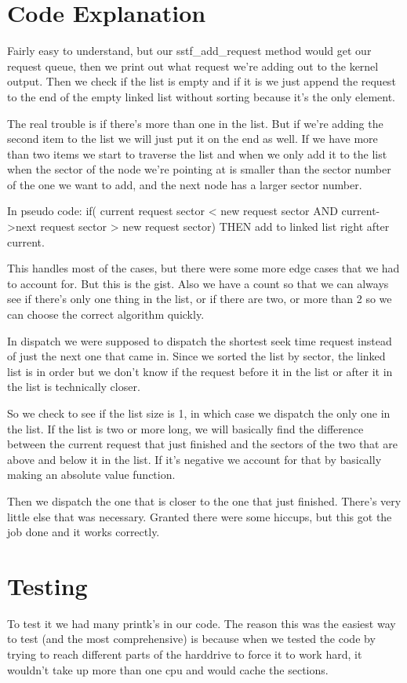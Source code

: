 \documentclass[letterpaper,10pt]{article}
\begin{document}
\section{Code Explanation}
Fairly easy to understand, but our sstf\_add\_request method would get our request queue, then we print out what request we're adding out to the kernel output. Then we check if the list is empty and if it is we just append the request to the end of the empty linked list without sorting because it's the only element. 

The real trouble is if there's more than one in the list. But if we're adding the second item to the list we will just put it on the end as well. If we have more than two items we start to traverse the list and when we only add it to the list when the sector of the node we're pointing at is smaller than the sector number of the one we want to add, and the next node has a larger sector number. 

In pseudo code: if( current request sector < new request sector AND current->next request sector > new request sector) THEN add to linked list right after current. 

This handles most of the cases, but there were some more edge cases that we had to account for. But this is the gist. Also we have a count so that we can always see if there's only one thing in the list, or if there are two, or more than 2 so we can choose the correct algorithm quickly.

In dispatch we were supposed to dispatch the shortest seek time request instead of just the next one that came in. Since we sorted the list by sector, the linked list is in order but we don't know if the request before it in the list or after it in the list is technically closer. 

So we check to see if the list size is 1, in which case we dispatch the only one in the list. If the list is two or more long, we will basically find the difference between the current request that just finished and the sectors of the two that are above and below it in the list. If it's negative we account for that by basically making an absolute value function. 

Then we dispatch the one that is closer to the one that just finished. There's very little else that was necessary. Granted there were some hiccups, but this got the job done and it works correctly. 

\section{Testing}
To test it we had many printk's in our code. The reason this was the easiest way to test (and the most comprehensive) is because when we tested the code by trying to reach different parts of the harddrive to force it to work hard, it wouldn't take up more than one cpu and would cache the sections. 
\end{document}
